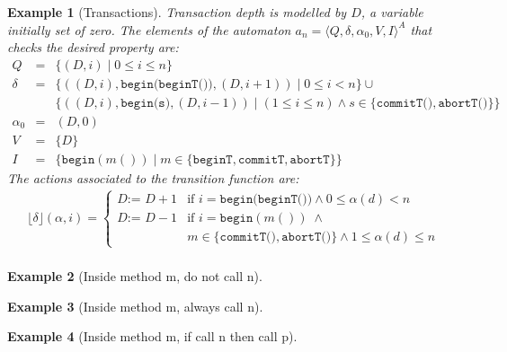 \documentclass[10pt,notitlepage,twoside]{article}
\newcommand{\aut}{a}
\newcommand{\automata}[5]{\langle #1,#2,#3,#4,#5 \rangle^A}
\newcommand{\qu}{\alpha}
\newcommand{\theautomaton}{\automata{Q}{\delta}{\qu_0}{V}{I}}
\newcommand{\floor}[1]{\lfloor #1 \rfloor}
\newtheorem{example}{Example}
\begin{document}
\begin{example}[Transactions]
Transaction depth is modelled by $D$, a variable initially set of zero. The elements of the automaton $\aut_n = \theautomaton$ that checks the desired property are:
\begin{displaymath}
\begin{array}{rcl}
Q & = &  \{ (D,i) \mid 0 \leq i \leq n  \}  \\
\delta & = &  \{ ((D,i),\texttt{begin(beginT())},(D,i+1)) \mid 0 \leq i < n \} \cup \\
& & \{ ((D,i),\texttt{begin(s)},(D,i-1)) \mid (1 \leq i \leq n) \wedge s \in \{\texttt{commitT()},\texttt{abortT()}   \} \}    \\
\qu_0 & = & (D,0) \\
V & = & \{ D \} \\
I & = & \{ \texttt{begin}(m()) \mid m \in \{ \texttt{beginT}, \texttt{commitT}, \texttt{abortT} \}  \}
\end{array}
\end{displaymath}
The actions associated to the transition function are:
\begin{displaymath}
\begin{array}{l}
\floor{\delta}(\qu,i) = \left \{ \begin{array}{ll}
D \texttt{:= } D + 1 & \mbox{if } i = \texttt{begin(beginT())} \wedge 0 \leq \qu(d) < n \\
D \texttt{:= } D - 1 & \mbox{if } i = \texttt{begin}(m())\; \wedge\\
 &  m \in  \{\texttt{commitT()},\texttt{abortT()}   \} \wedge 1 \leq \qu(d) \leq n
\end{array} \right . \\
\end{array}
\end{displaymath}

\end{example}



\begin{example}[Inside method m, do not call n] \end{example}

\begin{example}[Inside method m, always call n] \end{example}

\begin{example}[Inside method m, if call n then call p]  \end{example}


\end{document}
